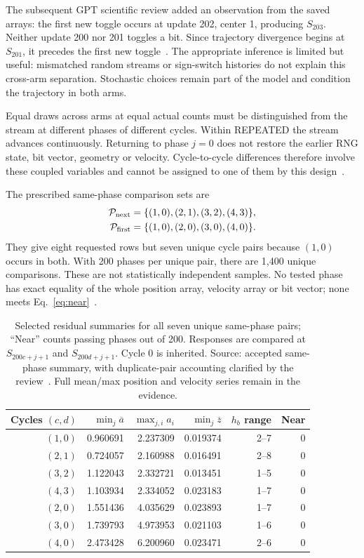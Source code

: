 \documentclass[11pt,a4paper]{article}
\begin{document}
The subsequent GPT scientific review added an observation from the saved arrays: the first new toggle occurs at update 202, center 1, producing $S_{203}$. Neither update 200 nor 201 toggles a bit. Since trajectory divergence begins at $S_{201}$, it precedes the first new toggle~\cite{additional}. The appropriate inference is limited but useful: mismatched random streams or sign-switch histories do not explain this cross-arm separation. Stochastic choices remain part of the model and condition the trajectory in both arms.

Equal draws across arms at equal actual counts must be distinguished from the stream at different phases of different cycles. Within REPEATED the stream advances continuously. Returning to phase $j=0$ does not restore the earlier RNG state, bit vector, geometry or velocity. Cycle-to-cycle differences therefore involve these coupled variables and cannot be assigned to one of them by this design~\cite{review}.

The prescribed same-phase comparison sets are
\begin{align}
 \mathcal P_{\rm next}&=\{(1,0),(2,1),(3,2),(4,3)\},\\
 \mathcal P_{\rm first}&=\{(1,0),(2,0),(3,0),(4,0)\}.
\end{align}
They give eight requested rows but seven unique cycle pairs because $(1,0)$ occurs in both. With 200 phases per unique pair, there are 1,400 unique comparisons. These are not statistically independent samples. No tested phase has exact equality of the whole position array, velocity array or bit vector; none meets Eq.~\eqref{eq:near}~\cite{review,reviewdata}.

\begin{table}[htbp]
\centering\small
\begin{tabular}{rrrrrr}
\toprule Cycles $(c,d)$ & $\min_j\overline a$ & $\max_{j,i}a_i$ & $\min_j\overline z$ & $h_b$ range & Near \\
\midrule
$(1,0)$ & 0.960691 & 2.237309 & 0.019374 & 2--7 & 0 \\
$(2,1)$ & 0.724057 & 2.160988 & 0.016491 & 2--8 & 0 \\
$(3,2)$ & 1.122043 & 2.332721 & 0.013451 & 1--5 & 0 \\
$(4,3)$ & 1.103934 & 2.334052 & 0.023183 & 1--7 & 0 \\
$(2,0)$ & 1.551436 & 4.035629 & 0.023893 & 1--7 & 0 \\
$(3,0)$ & 1.739793 & 4.973953 & 0.021103 & 1--6 & 0 \\
$(4,0)$ & 2.473428 & 6.200960 & 0.023471 & 2--6 & 0 \\
\bottomrule
\end{tabular}
\caption{Selected residual summaries for all seven unique same-phase pairs; ``Near'' counts passing phases out of 200. Responses are compared at $S_{200c+j+1}$ and $S_{200d+j+1}$. Cycle 0 is inherited. Source: accepted same-phase summary, with duplicate-pair accounting clarified by the review~\cite{records,reviewdata}. Full mean/max position and velocity series remain in the evidence.}
\label{tab:near}
\end{table}
\end{document}
